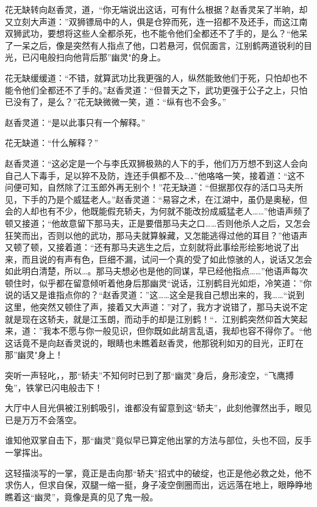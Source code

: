 \documentclass[12pt,oneside]{book}
\begin{document}
花无缺转向赵香灵，道，``你无端说出这话，可有什么根据？赵香灵呆了半晌，却又立刻大声道：''双狮镖局中的人，俱是仓猝而死，连一招都不及还手，而这江南双狮武功，要想将这些人全都杀死，也不能令他们全都还不了手的，是么？``他呆了一呆之后，像是突然有人指点了他，口若悬河，侃侃面言，江别鹤两道锐利的目光，已闪电般扫向他背后那''幽灵"的身上。

花无缺缓缓道：``不错，就算武功比我更强的人，纵然能致他们于死，只怕却也不能令他们全都还不了手的。''赵香灵道：``但普天之下，武功更强于公子之上，只怕已没有了，是么？''花无缺微微一笑，道：``纵有也不会多。''

赵香灵道：``是以此事只有一个解释。''

花无缺道：``什么解释？''

赵香灵道：``这必定是一个与李氏双狮极熟的人下的手，他们万万想不到这人会向自己人下毒手，足以猝不及防，连还手俱都不及\ldots．''他咯咯一笑，接着道：``这不问便可知，自然除了江玉郎外再无别个！''花无缺道：``但据那仅存的活口马夫所见，下手的乃是个威猛老人。''赵香灵道：``易容之术，在江湖中，虽仍是奥秘，但会的人却也有不少，他既能假充轿夫，为何就不能改扮成威猛老人\ldots\ldots{}''他语声频了顿又接道；``他故意留下那马夫，正是要借那马夫之口\ldots\ldots 否则他杀人之后，又怎会狂笑而出，否则以他的武功，那马夫就算躲藏，又怎能逃得过他的耳目？''他语声又顿了顿，又接着道：``还有那马夫逃生之后，立刻就将此事绘形绘影地说了出来，而且说的有声有色，巨细不漏，试问一个真的受了如此惊骇的人，说话又怎会如此明白清楚，所以\ldots。那马夫想必也是他的同谋，早已经他指点\ldots\ldots{}''他语声每次顿住时，似乎都在留意倾听着他身后那幽灵``说话，江别鹤目光如炬，冷笑道：''你说的话又是谁指点你的？``赵香灵道：''这\ldots\ldots 这全是我自己想出来的，我\ldots\ldots{}``说到这里，他突然又顿住了声，接着又大声道：''对了，我方才说错了，那马夫说不定就是现在这轿夫，就是江玉朗，而动手的却是江别鹤！``．江别鹤突然仰首大笑起来，道：''我本不愿与你一般见识，但你既如此胡言乱语，我却也容不得你了。``他这话竟不是向赵香灵说的，眼睛也未瞧着赵香灵，他那锐利如刃的目光，正盯在那''幽灵"身上！

突听一声轻叱，，那``轿夫''不知何时已到了那``幽灵''身后，身形凌空，``飞鹰搏兔''，铁掌已闪电般击下！

大厅中人目光俱被江别鹤吸引，谁都没有留意到这``轿夫''，此刻他骤然出手，眼见已是万万不会落空。

谁知他双掌自击下，那``幽灵''竟似早已算定他出掌的方法与部位，头也不回，反手一掌挥出。

这轻描淡写的一掌，竟正是击向那``轿夫''招式中的破绽，也正是他必救之处，他不求伤人，但求自保，双腿一缩一挺，身子凌空倒圈而出，远远落在地上，眼睁睁地瞧着这``幽灵''，竟像是真的见了鬼一般。
\end{document}
